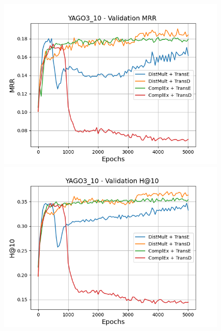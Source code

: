 \begin{figure}
    \centering
    \begin{minipage}{.45\textwidth}
      \centering
      \includegraphics[width=0.9\linewidth]{figures/results/gan_train/pretrained/uncertainty/max/entropy/yago3_10/5k_epochs/uncertainty_yago3_10_mrrs.png}
    \end{minipage}%
    \begin{minipage}{.45\textwidth}
      \centering
      \includegraphics[width=0.9\linewidth]{figures/results/gan_train/pretrained/uncertainty/max/entropy/yago3_10/5k_epochs/uncertainty_yago3_10_hit10.png}
    \end{minipage}
    

\end{figure}
